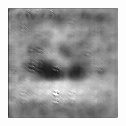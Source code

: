 \begin{figure}[H]
\begin{subfigure}[t]{0.13\textwidth}
  \end{subfigure}
  \begin{subfigure}[t]{0.13\textwidth}
    \centering
    \includegraphics[width=\linewidth]{img/one-trial/prediction_3_adversarial.png}
  \end{subfigure}
  \\
    \vspace{0.1cm}
  

\end{figure}
